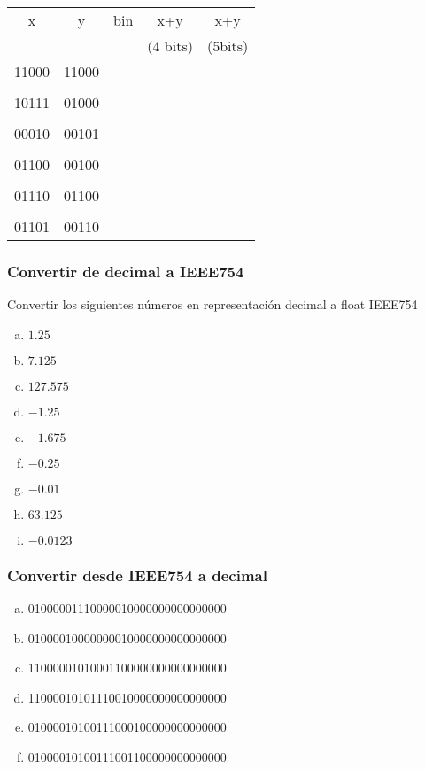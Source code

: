 \begin{tabular}{ccccc}
x&y&bin&x+y&x+y\\
&&&(4 bits)&(5bits)\\
11000&11000&\underspace&\underspace&\underspace\\
&&&&\\
10111&01000&\underspace&\underspace&\underspace\\
&&&&\\
00010&00101&\underspace&\underspace&\underspace\\
&&&&\\
01100&00100&\underspace&\underspace&\underspace\\
&&&&\\
01110&01100&\underspace&\underspace&\underspace\\
&&&&\\
01101&00110&\underspace&\underspace&\underspace\\
\end{tabular}

\subsubsection{Convertir de decimal a IEEE754}
Convertir los siguientes números en representación decimal a float IEEE754
\begin{enumerate}[a)]
  \item $1.25$
  \item $7.125$
  \item $127.575$
  \item $-1.25$
  \item $-1.675$
  \item $-0.25$
  \item $-0.01$
  \item $63.125$
  \item $-0.0123$
\end{enumerate}

\subsubsection{Convertir desde IEEE754 a decimal}
\begin{enumerate}[a)]
  \item 01000001110000010000000000000000
  \item 01000010000000010000000000000000
  \item 11000001010001100000000000000000
  \item 11000010101110010000000000000000
  \item 01000010100111000100000000000000
  \item 01000010100111001100000000000000
\end{enumerate}

